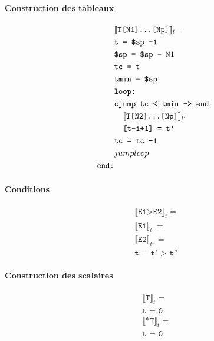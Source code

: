 \documentclass[12pt,twocolumn]{report}
\begin{document}
\begin{trad}
    \paragraph*{Construction des tableaux}
    \begin{align*}
        &\llbracket \texttt{T[N1]\dots[Np]} \rrbracket_t= \\
        &\texttt{t = \$sp -1} \\
        &\texttt{\$sp = \$sp - N1}\\
        &\texttt{tc = t} \\
        &\texttt{tmin = \$sp}\\
        &\texttt{loop:}\\
        &\texttt{cjump tc < tmin --> end}\\
        &\hphantom{aa}\llbracket \texttt{T[N2]\dots[Np]} \rrbracket_{t'}\\
        &\hphantom{aa}\texttt{[t-i+1] = t'}\\
        &\texttt{tc = tc -1}\\
        &jump loop\\
        \texttt{end:}&
    \end{align*}
\end{trad}
\begin{trad}
    \paragraph*{Conditions}
    \begin{align*}
        &\llbracket \texttt{E1>E2} \rrbracket_t = \\
        &\llbracket \texttt{E1} \rrbracket_{t'} = \\
        &\llbracket \texttt{E2} \rrbracket_{t''} = \\
        &\texttt{t = t' > t''}
    \end{align*}
\end{trad}
\begin{trad}
    \paragraph*{Construction des scalaires}
    \begin{align*}
        &\llbracket \texttt{T} \rrbracket_t= \\
        &\texttt{t = 0} \\
        &\llbracket \texttt{*T} \rrbracket_{t}= \\
        &\texttt{t = 0} 
    \end{align*}
\end{trad}
\end{document}
